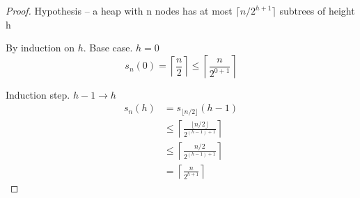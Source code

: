 \documentclass{article}
\begin{document}
\begin{tasks}
{            \begin{proof} 
                Hypothesis -- a heap with n nodes has at most \(\lceil n/2^{h+1}\rceil\) subtrees of height h

                By induction on \(h\). Base case. \(h = 0\)
                \begin{displaymath}
                    s_n(0) = \left\lceil\frac{n}{2}\right\rceil \leq \left\lceil\frac{n}{2^{0+1}}\right\rceil
                \end{displaymath}

                Induction step. \(h - 1 \to h\)
                \begin{displaymath}
                    \begin{aligned}
                        s_n(h) 
                        &= s_{\lfloor n/2\rfloor}(h - 1) \\
                        &\leq \left\lceil\frac{\lfloor n/2\rfloor}{2^{(h-1)+1}}\right\rceil \\
                        &\leq \left\lceil\frac{n/2}{2^{(h-1)+1}}\right\rceil \\
                        &= \left\lceil\frac{n}{2^{h+1}}\right\rceil
                    \end{aligned}
                \end{displaymath}
            \end{proof}
        }
    \end{tasks}
\end{document}
